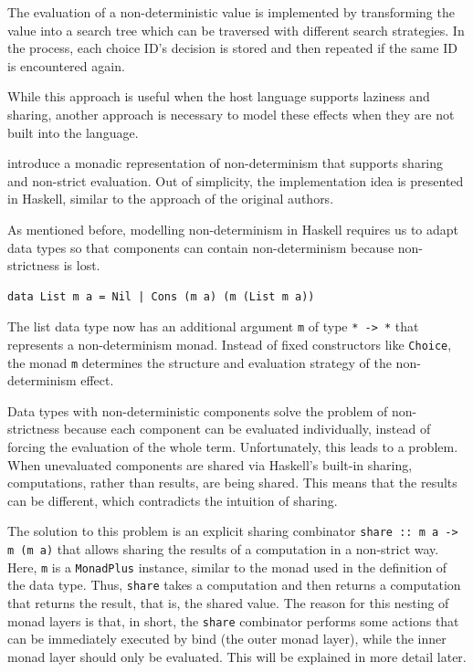 \documentclass[a4paper, 11pt, fleqn, twoside]{scrreprt}
\newcommand{\todo}[1]{\marginpar{\textbf{TODO:} #1}}
\begin{document}
The evaluation of a non-deterministic value is implemented by transforming the 
value into a search tree which can be traversed with different search 
strategies. In the process, each choice ID's decision is stored and then 
repeated if the same ID is encountered again.

While this approach is useful when the host language supports laziness and 
sharing, another approach is necessary to model these effects when they are not 
built into the language. 

\citet{PurelyFunctional} introduce a monadic representation of non-determinism 
that supports sharing and non-strict evaluation. Out of simplicity, the 
implementation idea is presented in Haskell, similar to the approach of the 
original authors.

As mentioned before, modelling non-determinism in Haskell requires us to adapt 
data types so that components can contain non-determinism because 
non-strictness is lost. \todo{Copy examples? New examples? No examples?}

\begin{verbatim}
data List m a = Nil | Cons (m a) (m (List m a))
\end{verbatim}

The list data type now has an additional argument \texttt{m} of 
type \texttt{* -> *} that represents a non-determinism monad. 
Instead of fixed constructors like \texttt{Choice}, the monad 
\texttt{m} determines the structure and evaluation strategy 
of the non-determinism effect.

Data types with non-deterministic components solve the problem of 
non-strictness because each component can be evaluated individually, instead of 
forcing the evaluation of the whole term. Unfortunately, this leads to a 
problem. When unevaluated components are shared via Haskell's built-in sharing, 
computations, rather than results, are being shared. This means that the 
results can be different, which contradicts the intuition of sharing.

The solution to this problem is an explicit sharing combinator 
\texttt{share :: m a -> m (m a)} that allows sharing the results 
of a computation in a non-strict way. Here, \texttt{m} is a 
\texttt{MonadPlus} instance, similar to the monad used in the 
definition of the data type. Thus, \texttt{share} takes a 
computation and then returns a computation that returns the result, that is, 
the shared value. The reason for this nesting of monad layers is that, in 
short, the \texttt{share} combinator performs some actions that 
can be immediately executed by bind (the outer monad layer), while the inner 
monad layer should only be evaluated. This will be explained in more detail 
later.
\end{document}
